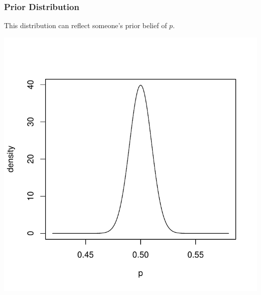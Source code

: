 \documentclass[slides]{beamer}
\newcommand{\blue}[1]{\textcolor{blue2}{#1}}
\begin{document}
\begin{frame}
\frametitle{Prior Distribution}
This distribution can reflect someone's \blue{prior belief} of $p$.  

\begin{center}
\includegraphics[height=0.7\textheight]{figure/prior.pdf} 
\end{center}

\end{frame}
\end{document}
